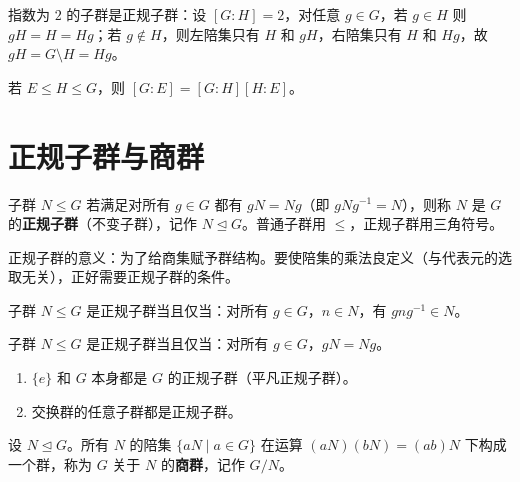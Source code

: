 \begin{note}
指数为 $2$ 的子群是正规子群：设 $[G:H]=2$，对任意 $g \in G$，若 $g \in H$ 则 $gH=H=Hg$；若 $g \notin H$，则左陪集只有 $H$ 和 $gH$，右陪集只有 $H$ 和 $Hg$，故 $gH = G \setminus H = Hg$。
\end{note}

\begin{theorem}[命题 1.34, 1.35：嵌套子群的陪集]
若 $E \le H \le G$，则 $[G:E] = [G:H][H:E]$。
\end{theorem}

\section{正规子群与商群}

\begin{definition}[正规子群（定义 1.29）]
子群 $N \le G$ 若满足对所有 $g \in G$ 都有 $gN = Ng$（即 $gNg^{-1} = N$），则称 $N$ 是 $G$ 的\textbf{正规子群}（不变子群），记作 $N \trianglelefteq G$。普通子群用 $\le$，正规子群用三角符号。
\end{definition}

\begin{note}
正规子群的意义：为了给商集赋予群结构。要使陪集的乘法良定义（与代表元的选取无关），正好需要正规子群的条件。
\end{note}

\begin{theorem}[不变子群的判定（定理 1）]
子群 $N \le G$ 是正规子群当且仅当：对所有 $g \in G$，$n \in N$，有 $gng^{-1} \in N$。
\end{theorem}

\begin{theorem}[不变子群的判定（定理 2）]
子群 $N \le G$ 是正规子群当且仅当：对所有 $g \in G$，$gN = Ng$。
\end{theorem}

\begin{proposition}[命题 1.39, 1.40]
\begin{enumerate}
  \item $\{e\}$ 和 $G$ 本身都是 $G$ 的正规子群（平凡正规子群）。
  \item 交换群的任意子群都是正规子群。
\end{enumerate}
\end{proposition}

\begin{definition}[商群（命题 1.37）]
设 $N \trianglelefteq G$。所有 $N$ 的陪集 $\{aN \mid a \in G\}$ 在运算 $(aN)(bN) = (ab)N$ 下构成一个群，称为 $G$ 关于 $N$ 的\textbf{商群}，记作 $G/N$。
\end{definition}

